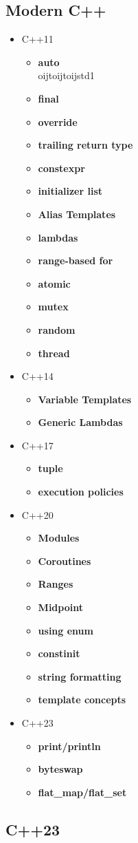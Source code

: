 \documentclass{article}
\begin{document}
\subsection{Modern C++}
\begin{itemize}
	\item C++11
	      \begin{itemize}
		      \item \textbf{auto}\\
		            oijtoijtoijstd1
		      \item \textbf{final}
		      \item \textbf{override}
		      \item \textbf{trailing return type}
		      \item \textbf{constexpr}
		      \item \textbf{initializer list}
		      \item \textbf{Alias Templates}
		      \item \textbf{lambdas}
		      \item \textbf{range-based for}
		      \item \textbf{atomic}
		      \item \textbf{mutex}
		      \item \textbf{random}
		      \item \textbf{thread}
	      \end{itemize}
	\item C++14
	      \begin{itemize}
		      \item \textbf{Variable Templates}
		      \item \textbf{Generic Lambdas}
	      \end{itemize}
	\item C++17
	      \begin{itemize}
		      \item \textbf{tuple}
		      \item \textbf{execution policies}
	      \end{itemize}
	\item C++20
	      \begin{itemize}
		      \item \textbf{Modules}
		      \item \textbf{Coroutines}
		      \item \textbf{Ranges}
		      \item \textbf{Midpoint}
		      \item \textbf{using enum}
		      \item \textbf{constinit}
		      \item \textbf{string formatting}
		      \item \textbf{template concepts}
	      \end{itemize}
	\item C++23
	      \begin{itemize}
		      \item \textbf{print/println}
		      \item \textbf{byteswap}
		      \item \textbf{flat\_map/flat\_set}
	      \end{itemize}
\end{itemize}
\subsection{C++23}
\end{document}
